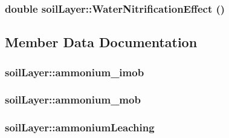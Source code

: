 \label{classsoil_layer_acbeec61312f9f83d6553a268e9dcbde2}
\hypertarget{classsoil_layer_a68c0eb08bca115585e5abc4cee3c11b7}{
\subsubsection[{WaterNitrificationEffect}]{\setlength{\rightskip}{0pt plus 5cm}double soilLayer::WaterNitrificationEffect ()}}
\label{classsoil_layer_a68c0eb08bca115585e5abc4cee3c11b7}


\subsection{Member Data Documentation}
\hypertarget{classsoil_layer_afcca8c6729c4acfef5af17e79f06640a}{
\subsubsection[{ammonium\_\-imob}]{ {\bf soilLayer::ammonium\_\-imob}}}
\label{classsoil_layer_afcca8c6729c4acfef5af17e79f06640a}
\hypertarget{classsoil_layer_a46a692f84c465b139ac6ba90f00929c8}{
\subsubsection[{ammonium\_\-mob}]{ {\bf soilLayer::ammonium\_\-mob}}}
\label{classsoil_layer_a46a692f84c465b139ac6ba90f00929c8}
\hypertarget{classsoil_layer_a5dd2dd5bfbdfc6d2e79a50136185da04}{
\subsubsection[{ammoniumLeaching}]{ {\bf soilLayer::ammoniumLeaching}}}
